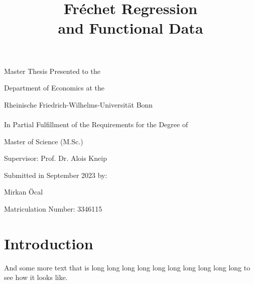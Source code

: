 \documentclass[12pt, a4paper, bibtotoc, liststotoc]{scrartcl}
\begin{document}
\begin{titlepage}
    \title{
        Fréchet Regression \\
        and Functional Data
    }
    \vspace{\fill}
    \author{}
    \date{}
    \maketitle

    \vspace{\fill}
    \begin{center}
        \large
        Master Thesis Presented to the

        Department of Economics at the

        Rheinische Friedrich-Wilhelms-Universität Bonn \\
        \ \\

        In Partial Fulfillment of the Requirements for the Degree of

        Master of Science (M.Sc.)

        \vspace{\fill}
        Supervisor: Prof. Dr. Alois Kneip

        \vspace{\fill}
        Submitted in September 2023 by:

        Mirkan Öcal

        Matriculation Number: 3346115
    \end{center}

    \thispagestyle{empty}
\end{titlepage}


\newpage %
\tableofcontents    %
\listoftables       %
\listoffigures      %

\newpage
{}

\section{Introduction}
\label{sec:introduction}

\citet{HorvathKokoszka2012}
\citet{HallHorowitz2007}
\citet{PetersenMüller2019}
\citet{VanDerVaartWellner1996}
\citet{Bosq2000}
\citet{HastiTibshiraniFriedman2009}

And some more text that is long long long long long long long long long long to see how
it looks like.
\end{document}
